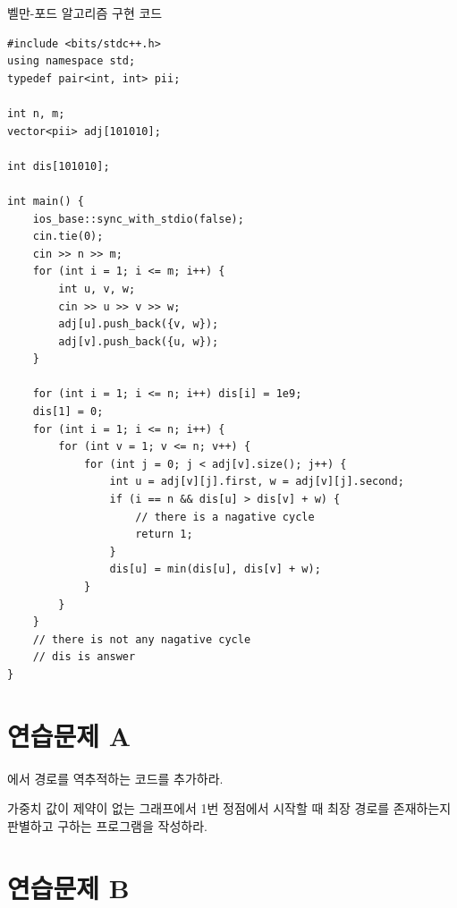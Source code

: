 \begin{code} \label{code: Bellman-Ford}
벨만-포드 알고리즘 구현 코드
\begin{lstlisting}
#include <bits/stdc++.h>
using namespace std;
typedef pair<int, int> pii;

int n, m;
vector<pii> adj[101010];

int dis[101010];

int main() {
    ios_base::sync_with_stdio(false);
    cin.tie(0);
    cin >> n >> m;
    for (int i = 1; i <= m; i++) {
        int u, v, w;
        cin >> u >> v >> w;
        adj[u].push_back({v, w});
        adj[v].push_back({u, w});
    }
    
    for (int i = 1; i <= n; i++) dis[i] = 1e9;
    dis[1] = 0;
    for (int i = 1; i <= n; i++) {
        for (int v = 1; v <= n; v++) {
            for (int j = 0; j < adj[v].size(); j++) {
                int u = adj[v][j].first, w = adj[v][j].second;
                if (i == n && dis[u] > dis[v] + w) {
                    // there is a nagative cycle
                    return 1;
                }
                dis[u] = min(dis[u], dis[v] + w);
            }
        }
    }
    // there is not any nagative cycle
    // dis is answer
}
\end{lstlisting}
\end{code}

\section{연습문제 A}
\begin{problem}
    에서 경로를 역추적하는 코드를 추가하라.
\end{problem}
\begin{problem}
    가중치 값이 제약이 없는 그래프에서 1번 정점에서 시작할 때 최장 경로를 존재하는지 판별하고 구하는 프로그램을 작성하라.
\end{problem}

\section{연습문제 B}

